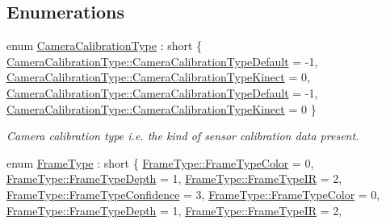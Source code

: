 \subsection*{Enumerations}
\begin{DoxyCompactItemize}
\item 
enum \hyperlink{namespacemoetsi_1_1ssp_a1f51291db51233dc5865d42e6ee36ef8}{Camera\+Calibration\+Type} \+: short \{ \hyperlink{namespacemoetsi_1_1ssp_a1f51291db51233dc5865d42e6ee36ef8ac32f0bb1b309dd3992d8e37bfaa00c78}{Camera\+Calibration\+Type\+::\+Camera\+Calibration\+Type\+Default} = -\/1, 
\hyperlink{namespacemoetsi_1_1ssp_a1f51291db51233dc5865d42e6ee36ef8a662285f55328b6f7305456b86b8056bb}{Camera\+Calibration\+Type\+::\+Camera\+Calibration\+Type\+Kinect} = 0, 
\hyperlink{namespacemoetsi_1_1ssp_a1f51291db51233dc5865d42e6ee36ef8ac32f0bb1b309dd3992d8e37bfaa00c78}{Camera\+Calibration\+Type\+::\+Camera\+Calibration\+Type\+Default} = -\/1, 
\hyperlink{namespacemoetsi_1_1ssp_a1f51291db51233dc5865d42e6ee36ef8a662285f55328b6f7305456b86b8056bb}{Camera\+Calibration\+Type\+::\+Camera\+Calibration\+Type\+Kinect} = 0
 \}\begin{DoxyCompactList}\small\item\em Camera calibration type i.\+e. the kind of sensor calibration data present. \end{DoxyCompactList}
\item 
enum \hyperlink{namespacemoetsi_1_1ssp_a46efdfa2cd5a28ead465dcc8006b5a87}{Frame\+Type} \+: short \{ \newline
\hyperlink{namespacemoetsi_1_1ssp_a46efdfa2cd5a28ead465dcc8006b5a87ad039a5ecd3504edc955b88006db4ba21}{Frame\+Type\+::\+Frame\+Type\+Color} = 0, 
\hyperlink{namespacemoetsi_1_1ssp_a46efdfa2cd5a28ead465dcc8006b5a87a59cea6d94577d85ef8e142036e047064}{Frame\+Type\+::\+Frame\+Type\+Depth} = 1, 
\hyperlink{namespacemoetsi_1_1ssp_a46efdfa2cd5a28ead465dcc8006b5a87a2c799f7416882b538fa8295567f65cf5}{Frame\+Type\+::\+Frame\+Type\+IR} = 2, 
\hyperlink{namespacemoetsi_1_1ssp_a46efdfa2cd5a28ead465dcc8006b5a87a1b85b2c60b857778932e29e0e5021ba1}{Frame\+Type\+::\+Frame\+Type\+Confidence} = 3, 
\newline
\hyperlink{namespacemoetsi_1_1ssp_a46efdfa2cd5a28ead465dcc8006b5a87ad039a5ecd3504edc955b88006db4ba21}{Frame\+Type\+::\+Frame\+Type\+Color} = 0, 
\hyperlink{namespacemoetsi_1_1ssp_a46efdfa2cd5a28ead465dcc8006b5a87a59cea6d94577d85ef8e142036e047064}{Frame\+Type\+::\+Frame\+Type\+Depth} = 1, 
\hyperlink{namespacemoetsi_1_1ssp_a46efdfa2cd5a28ead465dcc8006b5a87a2c799f7416882b538fa8295567f65cf5}{Frame\+Type\+::\+Frame\+Type\+IR} = 2, 

\end{DoxyCompactItemize}
